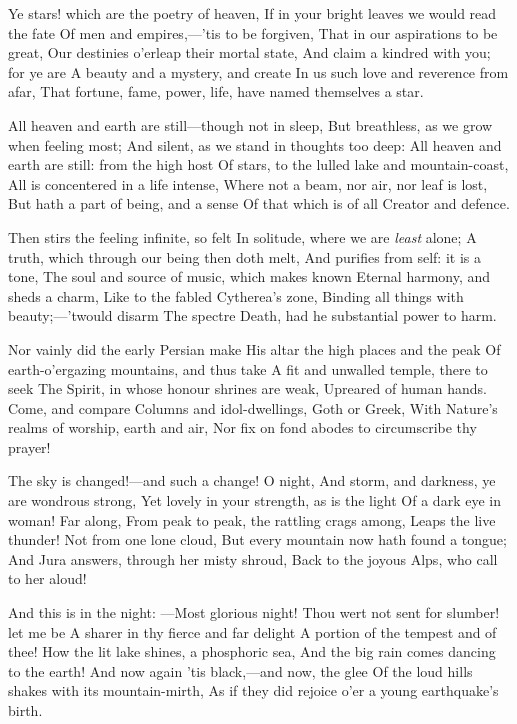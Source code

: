 \documentclass[10pt,twocolumn]{book}
\begin{document}
   Ye stars! which are the poetry of heaven,
   If in your bright leaves we would read the fate
   Of men and empires,---'tis to be forgiven,
   That in our aspirations to be great,
   Our destinies o'erleap their mortal state,
   And claim a kindred with you; for ye are
   A beauty and a mystery, and create
   In us such love and reverence from afar,
That fortune, fame, power, life, have named themselves a star.


   All heaven and earth are still---though not in sleep,
   But breathless, as we grow when feeling most;
   And silent, as we stand in thoughts too deep: \textemdash
   All heaven and earth are still:  from the high host
   Of stars, to the lulled lake and mountain-coast,
   All is concentered in a life intense,
   Where not a beam, nor air, nor leaf is lost,
   But hath a part of being, and a sense
Of that which is of all Creator and defence.


   Then stirs the feeling infinite, so felt
   In solitude, where we are \textit{least} alone;
   A truth, which through our being then doth melt,
   And purifies from self:  it is a tone,
   The soul and source of music, which makes known
   Eternal harmony, and sheds a charm,
   Like to the fabled Cytherea's zone,
   Binding all things with beauty;---'twould disarm
The spectre Death, had he substantial power to harm.


   Nor vainly did the early Persian make
   His altar the high places and the peak
   Of earth-o'ergazing mountains, and thus take
   A fit and unwalled temple, there to seek
   The Spirit, in whose honour shrines are weak,
   Upreared of human hands.  Come, and compare
   Columns and idol-dwellings, Goth or Greek,
   With Nature's realms of worship, earth and air,
Nor fix on fond abodes to circumscribe thy prayer!


   The sky is changed!---and such a change!  O night,
   And storm, and darkness, ye are wondrous strong,
   Yet lovely in your strength, as is the light
   Of a dark eye in woman!  Far along,
   From peak to peak, the rattling crags among,
   Leaps the live thunder!  Not from one lone cloud,
   But every mountain now hath found a tongue;
   And Jura answers, through her misty shroud,
Back to the joyous Alps, who call to her aloud!


   And this is in the night: ---Most glorious night!
   Thou wert not sent for slumber! let me be
   A sharer in thy fierce and far delight\textemdash
   A portion of the tempest and of thee!
   How the lit lake shines, a phosphoric sea,
   And the big rain comes dancing to the earth!
   And now again 'tis black,---and now, the glee
   Of the loud hills shakes with its mountain-mirth,
As if they did rejoice o'er a young earthquake's birth.
\end{document}
